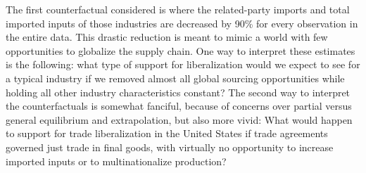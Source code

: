 \documentclass[hidelinks,12pt,letter]{article}
\begin{document}
The first counterfactual considered is where the related-party imports and total imported inputs of those industries are decreased by 90\% for every observation in the entire data. This drastic reduction is meant to mimic a world with few opportunities to globalize the supply chain. One way to interpret these estimates is the following: what type of support for liberalization would we expect to see for a typical industry if we removed almost all global sourcing opportunities while holding all other industry characteristics constant? The second way to interpret the counterfactuals is somewhat fanciful, because of concerns over partial versus general equilibrium and extrapolation, but also more vivid: What would happen to support for trade liberalization in the United States if trade agreements governed just trade in final goods, with virtually no opportunity to increase imported inputs or to multinationalize production? 
\end{document}
